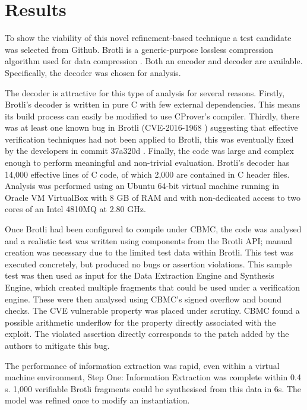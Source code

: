 \documentclass[EPiCempty]{easychair}
\begin{document}
\section{Results}
\label{sec:results}

To show the viability of this novel refinement-based technique a test candidate was selected from Github.  Brotli is a generic-purpose lossless compression algorithm  used for data compression \cite{BrotliDraft}.  Both an encoder and decoder are available.   Specifically, the decoder was chosen for analysis.

The decoder is attractive for this type of analysis for several reasons. Firstly, Brotli's decoder is written in pure C with few external dependencies.  This means its build process can easily be modified to use CProver's compiler.  Thirdly, there was at least one known bug in Brotli (CVE-2016-1968 \cite{CVE-2016-1968}) suggesting that effective verification techniques had not been applied to Brotli, this was eventually fixed by the developers in commit 37a320d \cite{Brotli}.  Finally, the code was large and complex enough to perform meaningful and non-trivial evaluation.  Brotli's decoder has 14,000 effective lines of C code, of which 2,000 are contained in C header files.  Analysis was performed using an Ubuntu  64-bit virtual machine running in Oracle VM VirtualBox with 8 GB of RAM and with non-dedicated access to two cores of an Intel 4810MQ at 2.80 GHz.

Once Brotli had been configured to compile under CBMC, the code was analysed and a realistic test was written using components from the Brotli API; manual creation was necessary due to the limited test data within Brotli.  This test was executed concretely, but produced no bugs or assertion violations.  This sample test was then used as input for the Data Extraction Engine and Synthesis Engine, which created multiple fragments that could be used under a verification engine.  These were then analysed using CBMC's signed overflow and bound checks.  The CVE vulnerable property was placed under scrutiny.  CBMC found a possible arithmetic underflow for the property directly associated with the exploit.  The violated assertion directly corresponds to the patch added by the authors to mitigate this bug.  

The performance of information extraction was rapid, even within a virtual machine environment, Step One: Information Extraction was complete within 0.4 s.  1,000 verifiable Brotli fragments could be synthesised from this data in 6s.  The model was refined once to modify an instantiation.  
\end{document}
